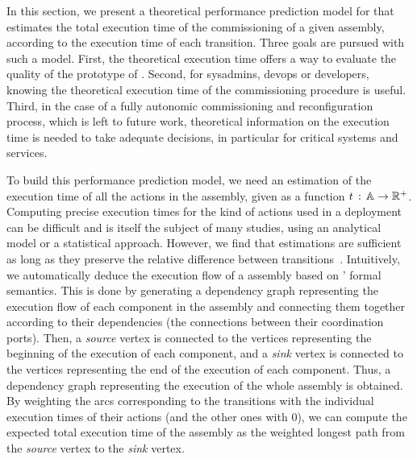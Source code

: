 In this section, we present a theoretical performance prediction model
for \mad that estimates the total execution time of the
commissioning of a given assembly, according to the execution time of
each transition. Three goals are pursued with such a model. First, the
theoretical execution time offers a way to evaluate the quality of the
prototype of \mad. Second, for sysadmins, devops or developers,
knowing the theoretical execution time of the commissioning procedure
is useful. Third, in the case of a fully autonomic commissioning and
reconfiguration process, which is left to future work, theoretical
information on the execution time is needed to take adequate
decisions, in particular for critical systems and services.

To build this performance prediction model, we need an estimation of
the execution time of all the actions in the assembly, given as a
function $t\,:\,\mathbb{A}\rightarrow\mathbb{R}^+$.  Computing
precise execution times for the kind of actions used in a deployment
can be difficult and is itself the subject of many studies, \eg using
an analytical model or a statistical approach. However, we find that estimations are sufficient as long as they preserve the relative difference between transitions~\cite{coullon:hal-02323641}. 
%
Intuitively, we automatically deduce the execution flow of a \mad
assembly based on \mad' formal semantics. This is done by generating a
dependency graph representing the execution flow of each \mad
component in the assembly and connecting them together according to their
dependencies (the connections between their coordination ports). Then, a
\emph{source} vertex is connected to the vertices representing the beginning of
the execution of each component, and a \emph{sink} vertex is connected to
the vertices representing the end of the execution of each component.
%
Thus, a dependency graph representing the execution of the whole assembly is obtained. By weighting the arcs corresponding to the transitions with the individual execution times of their actions (and the other ones with 0), we can compute the expected total execution time of the assembly as the weighted longest path from the \emph{source} vertex to the \emph{sink} vertex.


